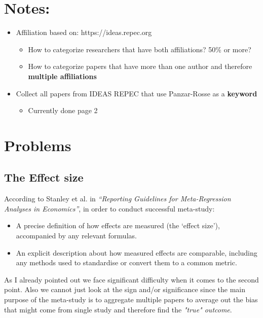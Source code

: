 \documentclass{article}
\begin{document}
\section{Notes:}

\begin{itemize}
    \item Affiliation based on: https://ideas.repec.org
        \begin{itemize}
            \item How to categorize researchers that have both affiliations? 50\% or more?
            \item How to categorize papers that have more than one author and therefore \textbf{multiple affiliations}
        \end{itemize}
    \item Collect all papers from IDEAS REPEC that use Panzar-Rosse as a \textbf{keyword}
        \begin{itemize}
            \item Currently done page 2
        \end{itemize}
\end{itemize}


\section{Problems}

\subsection*{The Effect size}

According to Stanley et al. in \textit{“Reporting Guidelines for Meta-Regression Analyses in Economics”}, in order to conduct successful meta-study:
\begin{itemize}
    \item A precise definition of how effects are measured (the ‘effect size’), accompanied by any relevant formulas.
    \item An explicit description about how measured effects are comparable, including any methods used to standardise or convert them to a common metric.
\end{itemize}

\newline \noindent
As I already pointed out we face significant difficulty when it comes to the second point. Also we cannot just look at the sign and/or significance since the main purpose of the meta-study is to aggregate multiple papers to average out the bias that might come from single study and therefore find the \textit{"true" outcome}.   \\
\end{document}

